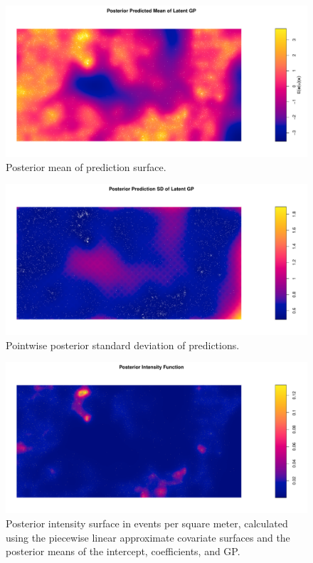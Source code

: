 \documentclass[]{interact}
\begin{document}
\begin{figure}[h]
\includegraphics[width=\textwidth]{figures/beimean.pdf}
\caption{Posterior mean of prediction surface.}
\label{beimean}
\end{figure}

\begin{figure}[h]
\includegraphics[width=\textwidth]{figures/beisd.pdf}
\caption{Pointwise posterior standard deviation of predictions.}
\label{beisd}
\end{figure}

\begin{figure}[h]
\includegraphics[width=\textwidth]{figures/beiintensity.pdf}
\caption{Posterior intensity surface in events per square meter, calculated
using the piecewise linear approximate covariate surfaces and the posterior
means of the intercept, coefficients, and GP.}
\label{beiintensity}
\end{figure}
\end{document}
